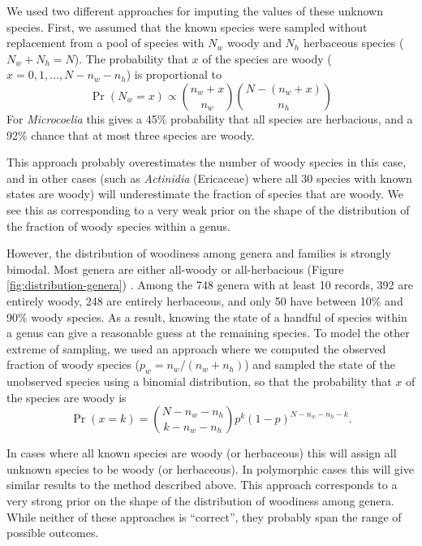 \documentclass[12pt]{article}
\begin{document}
We used two different approaches for imputing the values of these
unknown species. First, we assumed that the known species were
sampled without replacement from a pool of species with $N_w$ woody
and $N_h$ herbaceous species ($N_w + N_h = N$). The probability that
$x$ of the species are woody ($x = 0, 1, \ldots, N - n_w - n_h$) is
proportional to
\begin{equation}
  \Pr(N_w = x) \propto {n_w + x \choose n_w}
  {N - (n_w + x) \choose n_h}
\end{equation}
For \textit{Microcoelia} this gives a 45\% probability that all
species are herbacious, and a 92\% chance that at most three species
are woody.

This approach probably overestimates the number of woody species in
this case, and in other cases (such as \textit{Actinidia} (Ericaceae)
where all 30 species with known states are woody) will underestimate
the fraction of species that are woody. We see this as corresponding
to a very weak prior on the shape of the distribution of the fraction
of woody species within a genus.

However, the distribution of woodiness among genera and families is strongly
bimodal. Most genera are either all-woody or all-herbacious (Figure
\ref{fig:distribution-genera}) \citep{sinnott1915evolution}. Among the 748 genera with at least 10 records, 392 are entirely woody, 248 are entirely herbaceous, and only
50 have between 10\% and 90\% woody species. As a result, knowing the
state of a handful of species within a genus can give a reasonable
guess at the remaining species. 
To model the other extreme of sampling, we used an approach where we
computed the observed fraction of woody species ($p_w = n_w / (n_w +
n_h)$) and sampled the state of the unobserved species using a
binomial distribution, so that the probability that $x$ of the species
are woody is
\begin{equation}
  \Pr(x = k) = {N - n_w - n_h \choose k - n_w - n_h} 
  p^k (1-p)^{N - n_w - n_h - k}.
\end{equation}

In cases where all known species are woody (or herbaceous) this will
assign all unknown species to be woody (or herbaceous). In
polymorphic cases this will give similar results to the method described above. This
approach corresponds to a very strong prior on the shape of the
distribution of woodiness among genera.
While neither of these approaches is ``correct'', they probably
span the range of possible outcomes.
\end{document}
